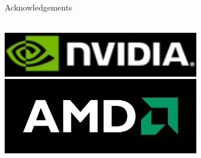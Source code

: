 \begin{frame}{Acknowledgements}
\begin{minipage}{0.4\textwidth}
  \vspace*{0.2cm} \\
  \includegraphics[width=0.65\textwidth]{figures/nvidia_logo_black.png}
  \vspace*{0.2cm} \\
  \includegraphics[width=0.65\textwidth]{figures/amd-logo.png}
 \end{minipage}

\end{frame}


